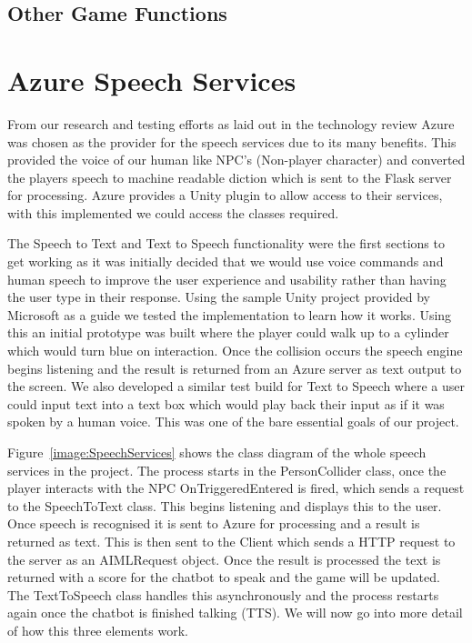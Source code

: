 \subsection{Other Game Functions}

\section{Azure Speech Services}
From our research and testing efforts as laid out in the technology review Azure was chosen as the provider for the speech services due to its many benefits. This provided the voice of our human like NPC's (Non-player character) and converted the players speech to machine readable diction which is sent to the Flask server for processing. Azure provides a Unity plugin to allow access to their services, with this implemented we could access the classes required.

\par
\medskip

The Speech to Text and Text to Speech functionality were the first sections to get working as it was initially decided that we would use voice commands and human speech to improve the user experience and usability rather than having the user type in their response. Using the sample Unity project provided by Microsoft as a guide we tested the implementation to learn how it works. Using this an initial prototype was built where the player could walk up to a cylinder which would turn blue on interaction. Once the collision occurs the speech engine begins listening and the result is returned from an Azure server as text output to the screen. We also developed a similar test build for Text to Speech where a user could input text into a text box which would play back their input as if it was spoken by a human voice. This was one of the bare essential goals of our project.

\par
\medskip

Figure~\ref{image:SpeechServices} shows the class diagram of the whole speech services in the project. The process starts in the PersonCollider class, once the player interacts with the NPC OnTriggeredEntered is fired, which sends a request to the SpeechToText class. This begins listening and displays this to the user. Once speech is recognised it is sent to Azure for processing and a result is returned as text. This is then sent to the Client which sends a HTTP request to the server as an AIMLRequest object. Once the result is processed the text is returned with a score for the chatbot to speak and the game will be updated. The TextToSpeech class handles this asynchronously and the process restarts again once the chatbot is finished talking (TTS). We will now go into more detail of how this three elements work.


